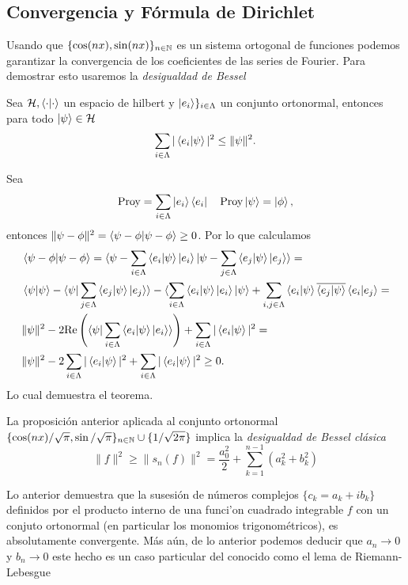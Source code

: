 \documentclass[main.tex]{subfiles}
\begin{document}
\subsection{Convergencia y Fórmula de Dirichlet}
\noindent Usando que \(\{\cos(nx),\sin(nx)\}_{n\in \mathbb N }\) es un sistema ortogonal de funciones podemos garantizar la convergencia de los coeficientes de las series de Fourier. Para demostrar esto usaremos la \emph{desigualdad de Bessel}
\begin{teorema}
  Sea \(\mathcal{H},\braket{\cdot|\cdot}\) un espacio de hilbert y \(\ket{e_i}\}_{i\in\Lambda}\) un conjunto ortonormal, entonces para todo \(\ket{\psi}\in\mathcal{H}\)
  \[
  \sum_{i\in\Lambda}|\braket{e_i|\psi}|^2\leq \|\psi\|^2.
  \]
\end{teorema}
\dem Sea
\[
        \textrm{Proy}=\sum_{i\in\Lambda} \ket{e_i}\bra{e_i}\quad\textrm{Proy}\ket{\psi}=\ket{\phi},
\]
entonces \(\|\psi-\phi\|^2=\braket{\psi-\phi|\psi-\phi}\geq0\). Por lo que calculamos
\begin{align*}
  &\braket{\psi-\phi|\psi-\phi}=\braket{\psi-\sum_{i\in\Lambda}\braket{e_i|\psi}\ket{e_i}|\psi-\sum_{j\in\Lambda}\braket{e_j|\psi}\ket{e_j}}=\\
  &\braket{\psi|\psi}-\braket{\psi|\sum_{j\in\Lambda}\braket{e_j|\psi}\ket{e_j}}-\braket{\sum_{i\in\Lambda}\braket{e_i|\psi}\ket{e_i}|\psi}+\sum_{i,j\in\Lambda}\braket{e_i|\psi}\overline{\braket{e_j|\psi}}\braket{e_i|e_j}=\\
  &\|\psi\|^{2}-2\textrm{Re}\left(\braket{\psi | \sum_{i\in\Lambda}\braket{e_{i}|\psi}\ket{e_{i}}}\right)+\sum_{i\in\Lambda}|\braket{e_i|\psi}|^2=\\
  &\|\psi\|^{2}-2\sum_{i\in\Lambda}|\braket{e_i|\psi}|^2+\sum_{i\in\Lambda}|\braket{e_i|\psi}|^2\geq0.
\end{align*}
Lo cual demuestra el teorema.\\
\QED
\begin{cor}
La proposici\'on anterior aplicada al conjunto ortonormal\\ \hbox{\(\{\cos(nx)/\sqrt{\pi},\sin/\sqrt{\pi}\}_{n\in \mathbb N }\cup\{1/\sqrt{2\pi}\}\)} implica la \emph{desigualdad de Bessel cl\'asica}
\begin{equation}
  \|f\|^{2}\geq\|s_{n}(f)\|^{2}=\frac{a_{0}^{2}}{2}+\sum_{k=1}^{n-1}(a_{k}^{2}+b_{k}^{2})
\end{equation}
\end{cor}
Lo anterior demuestra que la susesi\'on de n\'umeros complejos \(\{c_{k}=a_{k}+ib_{k}\}\) definidos por el producto interno de una funci'on cuadrado integrable \(f\) con un conjuto ortonormal (en particular los monomios trigonom\'etricos), es absolutamente convergente. M\'as a\'un, de lo anterior podemos deducir que \(a_{n}\to0\) y \(b_{n}\to0\) este hecho es un caso particular del conocido como el lema de Riemann-Lebesgue
\end{document}
